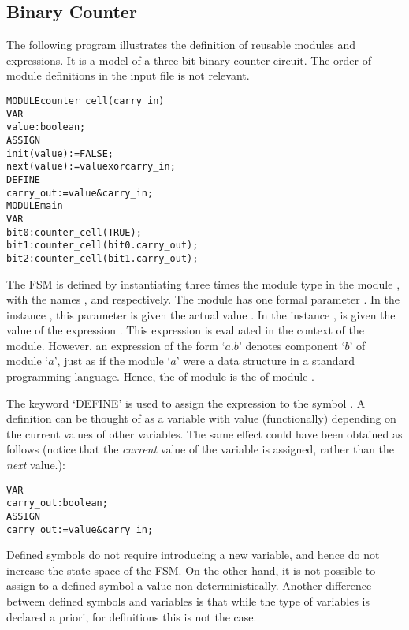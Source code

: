 \subsection{Binary Counter}
\label{Binary Counter Example}

The following program illustrates the definition of reusable modules and
expressions. It is a model of a three bit binary counter circuit.
The order of module definitions in the input file is not relevant.

\noindent
\begin{alltt}
MODULE counter_cell(carry_in)
 VAR
   value : boolean;
 ASSIGN
   init(value) := FALSE;
   next(value) := value xor carry_in;
 DEFINE
  carry_out := value & carry_in;
MODULE main
 VAR
   bit0 : counter_cell(TRUE);
   bit1 : counter_cell(bit0.carry_out);
   bit2 : counter_cell(bit1.carry_out);
\end{alltt}

The FSM is defined by instantiating three times the module
type  in the module , with the names
,  and  respectively. The  
module has one formal parameter . In
the instance , this parameter is given the actual value
. In the instance ,  is given the
value of the expression . This expression is
evaluated in the context of the  module. However, an
expression of the form `$a.b$' denotes component `$b$' of module
`$a$', just as if the module `$a$' were a data structure in a standard
programming language. Hence, the  of
module  is the
 of module .

The keyword `DEFINE' is used to assign the expression  
to the symbol . A definition can be thought of
as a variable with value (functionally) depending on the current values
of other variables. The same effect could have been obtained as follows
(notice that the \emph{current} value of the variable is assigned,
rather than the \emph{next} value.):\\
\pagebreak[3]
\begin{alltt}
VAR
  carry_out : boolean;
ASSIGN
  carry_out := value & carry_in;
\end{alltt}
Defined symbols do not require introducing a new variable, and hence do
not increase the state space of the FSM. On the other hand, it is not
possible to assign to a defined symbol a value
non-deterministically. Another difference between defined symbols and
variables is that while the type of variables is declared a priori, for
definitions this is not the case.


